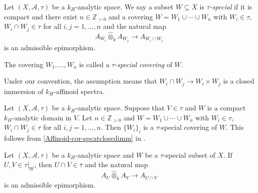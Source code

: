 \begin{definition}
    Let  $(X,\mathcal{A},\tau)$ be a $k_H$-analytic space. We say a subset $W\subseteq X$ is \emph{$\tau$-special} if it is compact and there exist $n\in \mathbb{Z}_{>0}$ and a covering $W=W_1\cup \cdots \cup W_n$  with $W_i\in \tau$, $W_i\cap W_j\in \tau$ for all $i,j=1,\ldots,n$ and the natural map
    \[
        A_{W_i}\hat{\otimes}_k A_{W_j}\rightarrow A_{W_i\cap W_j}  
    \]
    is an admissible epimorphism.

    The covering $W_1,\ldots,W_n$ is called a \emph{$\tau$-special covering} of $W$.
\end{definition}
Under our convention, the assumption means that $W_i\cap W_j\rightarrow W_i\times W_j$ is a closed immersion of $k_H$-affinoid spectra.


\begin{example}
    Let  $(X,\mathcal{A},\tau)$ be a $k_H$-analytic space.
    Suppose that $V\in \tau$ and $W$ is a compact $k_H$-analytic domain in $V$. Let $n\in \mathbb{Z}_{>0}$ and $W=W_1\cup \cdots \cup W_n$  with $W_i\in \tau$, $W_i\cap W_j\in \tau$ for all $i,j=1,\ldots,n$. Then $\{W_i\}_i$ is a $\tau$-special covering of $W$. This follows from \cref{Affinoid-cor-spcatclosedimm} in .
\end{example}


\begin{lemma}\label{lma-tauspecialanycov}
    Let  $(X,\mathcal{A},\tau)$ be a $k_H$-analytic space and $W$ be a $\tau$-special subset of $X$. If $U,V\in \tau|_W$, then $U\cap V\in \bar{\tau}$ and the natural map
    \[
        A_U\hat{\otimes}_k A_V\rightarrow A_{U\cap V}
    \]
    is an admissible epimorphism.
\end{lemma}


